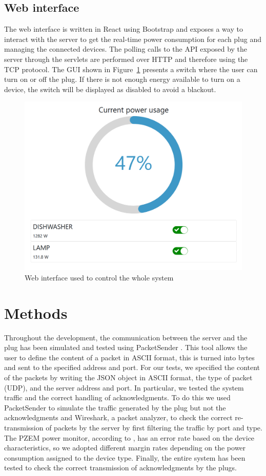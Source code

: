 \documentclass[conference]{IEEEtran}
\begin{document}
	\subsection{Web interface}\label{WI}
	The web interface is written in React using Bootstrap and exposes a way to interact with the server to get the real-time power consumption for each plug and managing the connected devices. The polling calls to the API exposed by the server through the servlets are performed over HTTP and therefore using the TCP protocol. The GUI shown in Figure~\ref{fig:simulatedwebapp} presents a switch where the user can turn on or off the plug. If there is not enough energy available to turn on a device, the switch will be displayed as disabled to avoid a blackout.
	\begin{figure}[htbp]
		\centering
		\includegraphics[width=0.7\linewidth]{assets/simulated_webapp}
		\caption{Web interface used to control the whole system}
		\label{fig:simulatedwebapp}
	\end{figure}
	
	\section{Methods}
	Throughout the development, the communication between the server and the plug has been simulated and tested using PacketSender \cite{packetsender}. This tool allows the user to define the content of a packet in ASCII format, this is turned into bytes and sent to the specified address and port. For our tests, we specified the content of the packets by writing the JSON object in ASCII format, the type of packet (UDP), and the server address and port. In particular, we tested the system traffic and the correct handling of acknowledgments. To do this we used PacketSender to simulate the traffic generated by the plug but not the acknowledgments and Wireshark, a packet analyzer, to check the correct re-transmission of packets by the server by first filtering the traffic by port and type. The PZEM power monitor, according to \cite{9264926}, has an error rate based on the device characteristics, so we adopted different margin rates depending on the power consumption assigned to the device type. Finally, the entire system has been tested to check the correct transmission of acknowledgments by the plugs.
	
\end{document}
